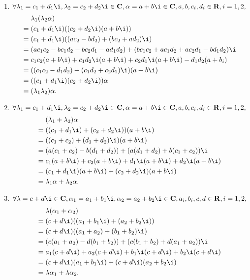 \begin{solution}
\begin{enumerate}
\begin{enumerate}
                    \item $\forall \lambda_1 = c_1+d_1\i, \lambda_2 = c_2+d_2\i \in \mathbf{C}, \alpha = a+b\i \in \mathbf{C}, a, b, c_i, d_i \in \mathbf{R}, i = 1, 2,$
                    \begin{align*}
                        & \lambda_1(\lambda_2 \alpha) \\ ={} & (c_1+d_1\i)((c_2+d_2\i)(a+b\i)) \\ ={} & (c_1+d_1\i)((ac_2-bd_2)+(bc_2+ad_2)\i) \\ ={} & (ac_1c_2-bc_1d_2-bc_2d_1-ad_1d_2)+(bc_1c_2+ac_1d_2+ac_2d_1-bd_1d_2)\i \\ ={} & c_1c_2(a+b\i)+c_1d_2\i(a+b\i)+c_2d_1\i(a+b\i)-d_1d_2(a+b_i) \\ ={} & ((c_1c_2-d_1d_2)+(c_1d_2+c_2d_1)\i)(a+b\i) \\ ={} & ((c_1+d_1\i)(c_2+d_2\i))\alpha \\ ={} & (\lambda_1 \lambda_2)\alpha.
                    \end{align*}

                    \item $\forall \lambda_1 = c_1+d_1\i, \lambda_2 = c_2+d_2\i \in \mathbf{C}, \alpha = a+b\i \in \mathbf{C}, a, b, c_i, d_i \in \mathbf{R}, i = 1, 2,$
                    \begin{align*}
                        & (\lambda_1 + \lambda_2) \alpha \\ ={} & ((c_1+d_1\i)+(c_2+d_2\i))(a+b\i) \\ ={} & ((c_1+c_2)+(d_1+d_2)\i)(a+b\i) \\ ={} & (a(c_1+c_2)-b(d_1+d_2))+(a(d_1+d_2)+b(c_1+c_2))\i \\ ={} & c_1(a+b\i)+c_2(a+b\i)+d_1\i(a+b\i)+d_2\i(a+b\i) \\ ={} & (c_1+d_1\i)(a+b\i)+(c_2+d_2\i)(a+b\i) \\ ={} & \lambda_1\alpha+\lambda_2\alpha.
                    \end{align*}

                    \item $\forall \lambda = c+d\i \in \mathbf{C}, \alpha_1 = a_1+b_1\i, \alpha_2 = a_2+b_2\i \in \mathbf{C}, a_i, b_i, c, d \in \mathbf{R}, i = 1, 2,$
                    \begin{align*}
                        & \lambda(\alpha_1+\alpha_2) \\ ={} & (c+d\i)((a_1+b_1\i)+(a_2+b_2\i)) \\ ={} & (c+d\i)((a_1+a_2)+(b_1+b_2)\i) \\ ={} & (c(a_1+a_2)-d(b_1+b_2))+(c(b_1+b_2)+d(a_1+a_2))\i \\ ={} & a_1(c+d\i)+a_2(c+d\i)+b_1\i(c+d\i)+b_2\i(c+d\i) \\ ={} & (c+d\i)(a_1+b_1\i)+(c+d\i)(a_2+b_2\i) \\ ={} & \lambda \alpha_1 + \lambda \alpha_2.
                    \end{align*}
                \end{enumerate}


\end{enumerate}
\end{solution}
